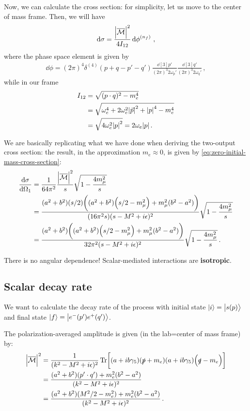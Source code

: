 \documentclass[main.tex]{subfiles}
\begin{document}
Now, we can calculate the cross section: for simplicity, let us move to the center of mass frame. Then, we will have 
%
\begin{align}
\dd{\sigma } = \frac{\abs{\mathcal{\overline{M}}}^2}{4 I_{12}} \dd{\phi }^{(n_f)}
\,,
\end{align}
%
where the phase space element is given by 
%
\begin{align}
\dd{\phi } = (2 \pi )^{4} \delta^{(4)} (p+q-p'-q') 
\frac{ \dd[3]{p'}}{(2 \pi )^3 2 \omega_{p}'} 
\frac{ \dd[3]{q'}}{(2 \pi )^3 2 \omega_{q}'} 
\,,
\end{align}
%
while in our frame 
%
\begin{align}
I_{12} &=  \sqrt{(p \cdot q)^2 - m_e^{4}}  \\
&= \sqrt{\omega_{e}^{4} + 2 \omega_{e}^2 \abs{\vec{p}}^2 + \abs{p}^{4} - m_e^{4}}  \\
&= \sqrt{4 \omega_{e}^2 \abs{p}^2} = 2 \omega_{e} \abs{p}
\,.
\end{align}

We are basically replicating what we have done when deriving the two-output cross section: the result, in the approximation \(m_e \approx 0\), is given by \eqref{eq:zero-initial-mass-cross-section}: 
%
\begin{align}
\dv{\sigma }{\Omega_1 } &= \frac{1}{64 \pi^2}\frac{\abs{\mathcal{\overline{M}}}^2 }{s} \sqrt{1 - \frac{4 m_\mu^2}{s}}  \\
&= \frac{(a^2 + b^2) (s/2) \qty( (a^2 + b^2) \qty( s/2 - m_\mu^2) +  m_\mu^2 ( b^2 -a ^2))}{ (16 \pi^2 s) (s- M^2 + i \epsilon)^2 }
\sqrt{1 - \frac{4 m_\mu^2}{s}}  \\
&= \frac{(a^2 + b^2)\qty( (a^2 + b^2) \qty( s/2 - m_\mu^2) +  m_\mu^2 ( b^2 -a ^2))}{ 32 \pi^2 (s- M^2 + i \epsilon)^2 }
\sqrt{1 - \frac{4 m_\mu^2}{s}}
\,.
\end{align}

There is no angular dependence! Scalar-mediated interactions are \textbf{isotropic}. 

\subsection{Scalar decay rate}

We want to calculate the decay rate of the process with initial state \(\ket{i} = \ket{s(p)}\) and final state \(\ket{f} = \ket{e^{-}(p') e^{+} (q')}\).

The polarization-averaged amplitude is given (in the lab=center of mass frame) by: 
%
\begin{align}
\abs{\mathcal{\overline{M}}}^2 
&= \frac{1}{(k^2 - M^2 + i \epsilon )^2}
\Tr[ (a + i b \gamma_5 ) (\slashed{p} + m_e) \qty(a + i b \gamma_5 ) \qty(\slashed{q} - m_e)]  \\
&= \frac{(a^2 + b^2)(p' \cdot q') + m_e^2 (b^2 - a^2)}{(k^2 -M^2+ i \epsilon)^2}  \\
&=\frac{(a^2 + b^2)(M^2 / 2- m_e^2) + m_e^2 (b^2 - a^2)}{(k^2 -M^2+ i \epsilon)^2}
\,.
\end{align}
\end{document}
